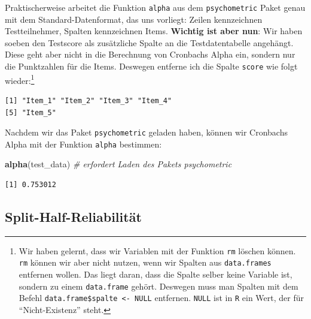 \documentclass[12pt,]{tufte-book}
\newenvironment{Shaded}{\begin{snugshade}}{\end{snugshade}}
\newcommand{\KeywordTok}[1]{\textcolor[rgb]{0.13,0.29,0.53}{\textbf{#1}}}
\newcommand{\StringTok}[1]{\textcolor[rgb]{0.31,0.60,0.02}{#1}}
\newcommand{\CommentTok}[1]{\textcolor[rgb]{0.56,0.35,0.01}{\textit{#1}}}
\newcommand{\OtherTok}[1]{\textcolor[rgb]{0.56,0.35,0.01}{#1}}
\newcommand{\OperatorTok}[1]{\textcolor[rgb]{0.81,0.36,0.00}{\textbf{#1}}}
\newcommand{\NormalTok}[1]{#1}
\theoremstyle{definition}
\theoremstyle{definition}
\theoremstyle{definition}
\theoremstyle{remark}
\begin{document}
Praktischerweise arbeitet die Funktion \texttt{alpha} aus dem
\texttt{psychometric} Paket genau mit dem Standard-Datenformat, das uns
vorliegt: Zeilen kennzeichnen Testteilnehmer, Spalten kennzeichnen
Items. \textbf{Wichtig ist aber nun}: Wir haben soeben den Testscore als
zusätzliche Spalte an die Testdatentabelle angehängt. Diese geht aber
nicht in die Berechnung von Cronbachs Alpha ein, sondern nur die
Punktzahlen für die Items. Deswegen entferne ich die Spalte
\texttt{score} wie folgt wieder:\footnote{Wir haben gelernt, dass wir
  Variablen mit der Funktion \texttt{rm} löschen können. \texttt{rm}
  können wir aber nicht nutzen, wenn wir Spalten aus
  \texttt{data.frames} entfernen wollen. Das liegt daran, dass die
  Spalte selber keine Variable ist, sondern zu einem \texttt{data.frame}
  gehört. Deswegen muss man Spalten mit dem Befehl
  \texttt{data.frame\$spalte\ \textless{}-\ NULL} entfernen.
  \texttt{NULL} ist in \texttt{R} ein Wert, der für ``Nicht-Existenz''
  steht.}

\begin{Shaded}
\end{Shaded}

\begin{verbatim}
[1] "Item_1" "Item_2" "Item_3" "Item_4"
[5] "Item_5"
\end{verbatim}

Nachdem wir das Paket \texttt{psychometric} geladen haben, können wir
Cronbachs Alpha mit der Funktion \texttt{alpha} bestimmen:

\begin{Shaded}
\begin{Highlighting}[]
\KeywordTok{alpha}\NormalTok{(test_data)  }\CommentTok{# erfordert Laden des Pakets psychometric}
\end{Highlighting}
\end{Shaded}

\begin{verbatim}
[1] 0.753012
\end{verbatim}

\subsection{Split-Half-Reliabilität}\label{split-half-reliabilituxe4t}
\end{document}
